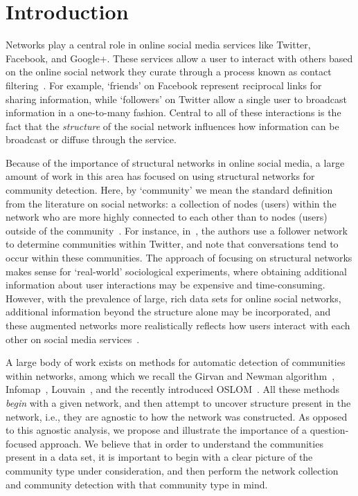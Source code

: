 \section{Introduction}

Networks play a central role in online social media services like Twitter, Facebook, and Google+. These services allow a user to interact with others based on the online social network they curate through a process known as contact filtering~\cite{cazabet2012automated}. For example, `friends' on Facebook represent reciprocal links for sharing information, while `followers' on Twitter allow a single user to broadcast information in a one-to-many fashion. Central to all of these interactions is the fact that the \emph{structure} of the social network influences how information can be broadcast or diffuse through the service.

Because of the importance of structural networks in online social media, a large amount of work in this area has focused on using structural networks for community detection. Here, by `community' we mean the standard definition from the literature on social networks: a collection of nodes (users) within the network who are more highly connected to each other than to nodes (users) outside of the community~\cite{newman2004finding}. For instance, in~\cite{java2009we}, the authors use a follower network to determine communities within Twitter, and note that conversations tend to occur within these communities. The approach of focusing on structural networks makes sense for `real-world' sociological experiments, where obtaining additional information about user interactions may be expensive and time-consuming. However, with the prevalence of large, rich data sets for online social networks, additional information beyond the structure alone may be incorporated, and these augmented networks more realistically reflects how users interact with each other on social media services~\cite{grabowicz2012social}.

A large body of work exists on methods for automatic detection of communities within networks, among which we recall the Girvan and Newman algorithm~\cite{newman2004finding}, Infomap~\cite{Rosvall08mapsof}, Louvain~\cite{blondel2008fast}, and the recently introduced OSLOM~\cite{LancichinettiPlos}.
All these methods \emph{begin} with a given network, and then attempt to uncover structure present in the network, i.e., they are agnostic to how the network was constructed. As opposed to this agnostic analysis, we propose and illustrate the importance of a question-focused approach. We believe that in order to understand the communities present in a data set, it is important to begin with a clear picture of the community type under consideration, and then perform the network collection and community detection with that community type in mind.


